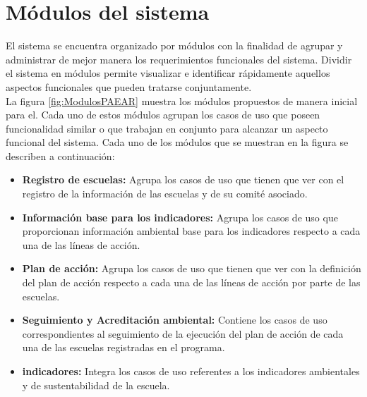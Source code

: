 
\section{Módulos del sistema}

    El sistema se encuentra organizado por módulos con la finalidad de agrupar y administrar de mejor manera los requerimientos funcionales del sistema. Dividir el sistema en módulos permite visualizar e identificar rápidamente aquellos aspectos funcionales que pueden tratarse conjuntamente. \\

    La figura \ref{fig:ModulosPAEAR} muestra los módulos propuestos de manera inicial para el. Cada uno de estos módulos agrupan los casos de uso que poseen funcionalidad similar o que trabajan en conjunto para alcanzar un aspecto funcional del sistema. Cada uno de los módulos que se muestran en la figura se describen a continuación:


    \begin{itemize}
	\item {\bf Registro de escuelas:} Agrupa los casos de uso que tienen que ver con el registro de la información de las escuelas y de su comité asociado. %

	\item {\bf Información base para los indicadores:} Agrupa los casos de uso que proporcionan información ambiental base para los indicadores respecto a cada una de las líneas de acción. %

	\item {\bf Plan de acción:} Agrupa los casos de uso que tienen que ver con la definición del plan de acción respecto a cada una de las líneas de acción por parte de las escuelas.%

	\item {\bf Seguimiento y Acreditación ambiental:} Contiene los casos de uso correspondientes al seguimiento de la ejecución del plan de acción de cada una de las escuelas registradas en el programa.%

	\item {\bf indicadores:} Integra los casos de uso referentes a los indicadores ambientales y de sustentabilidad de la escuela.



    \end{itemize}

